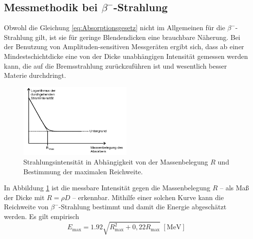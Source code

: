 \subsection{Messmethodik bei \texorpdfstring{$\beta^-$}{Beta}-Strahlung}
Obwohl die Gleichung \eqref{eq:Absorptionsgesetz} nicht im Allgemeinen für die $\beta^-$-Strahlung gilt, ist sie für geringe Blendendicken eine brauchbare Näherung.
Bei der Benutzung von Amplituden-sensitiven Messgeräten ergibt sich, dass ab einer Mindestschichtdicke eine von der Dicke unabhängigen Intensität gemessen werden kann, die auf die Bremsstrahlung zurückzuführen ist und wesentlich besser Materie durchdringt.
\begin{figure}[ht]
	\centering
	\includegraphics[width=0.5\textwidth]{Bilder/absorption.png}
	\caption{Strahlungsintensität in Abhängigkeit von der Massenbelegung $R$ und Bestimmung der maximalen Reichweite.\cite{skript}}
	\label{fig:messkurve}
\end{figure}
In Abbildung \ref{fig:messkurve} ist die messbare Intensität gegen die Massenbelegung $R$ -- als Maß der Dicke mit $R=\rho D$ -- erkennbar.
Mithilfe einer solchen Kurve kann die Reichweite von $\beta^-$-Strahlung bestimmt und damit die Energie abgeschätzt werden.
Es gilt empirisch
\begin{equation}
	E_\text{max}=1.92\sqrt{R_\text{max}^2+0,22R_\text{max}}\;[\si{\mega\electronvolt}]
\label{eq:e_max}
\end{equation}
